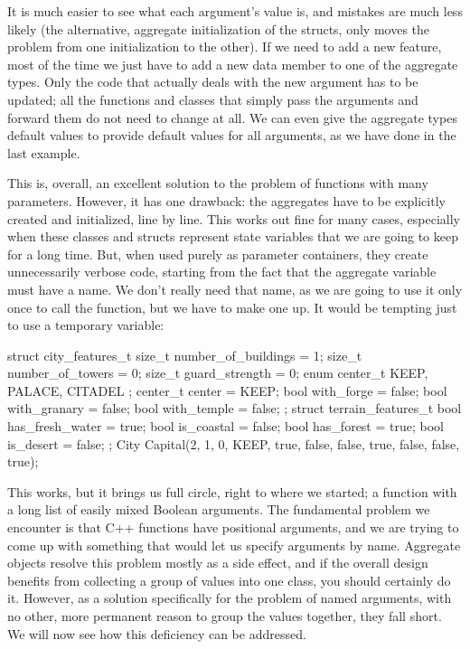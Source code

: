 It is much easier to see what each argument's value is, and mistakes are much less likely (the alternative, aggregate initialization of the structs, only moves the problem from one initialization to the other). If we need to add a new feature, most of the time we just have to add a new data member to one of the aggregate types. Only the code that actually deals with the new argument has to be updated; all the functions and classes that simply pass the arguments and forward them do not need to change at all. We can even give the aggregate types default values to provide default values for all arguments, as we have done in the last example.

This is, overall, an excellent solution to the problem of functions with many parameters. However, it has one drawback: the aggregates have to be explicitly created and initialized, line by line. This works out fine for many cases, especially when these classes and structs represent state variables that we are going to keep for a long time. But, when used purely as parameter containers, they create unnecessarily verbose code, starting from the fact that the aggregate variable must have a name. We don't really need that name, as we are going to use it only once to call the function, but we have to make one up. It would be tempting just to use a temporary variable:

\begin{code}
struct city_features_t {
  size_t number_of_buildings = 1;
  size_t number_of_towers = 0;
  size_t guard_strength = 0;
  enum center_t { KEEP, PALACE, CITADEL };
  center_t center = KEEP;
  bool with_forge = false;
  bool with_granary = false;
  bool with_temple = false;
};
struct terrain_features_t {
  bool has_fresh_water = true;
  bool is_coastal = false;
  bool has_forest = true;
  bool is_desert = false;
};
City Capital({2, 1, 0, KEEP, true, false, false},
             {true, false, false, true});
\end{code}

This works, but it brings us full circle, right to where we started; a function with a long list of easily mixed Boolean arguments. The fundamental problem we encounter is that C++ functions have positional arguments, and we are trying to come up with something that would let us specify arguments by name. Aggregate objects resolve this problem mostly as a side effect, and if the overall design benefits from collecting a group of values into one class, you should certainly do it. However, as a solution specifically for the problem of named arguments, with no other, more permanent reason to group the values together, they fall short. We will now see how this deficiency can be addressed.

